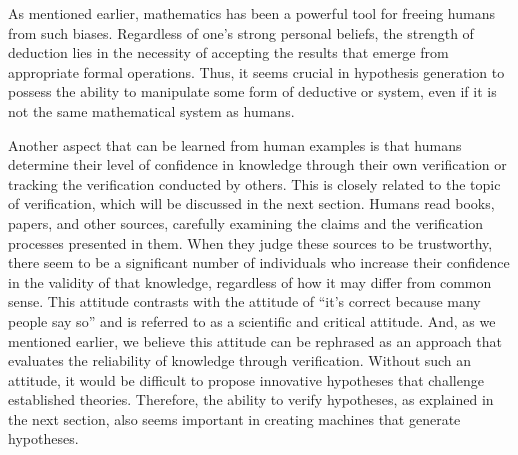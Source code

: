 \documentclass{book}
\begin{document}

As mentioned earlier, mathematics has been a powerful tool for freeing humans from such biases. Regardless of one's strong personal beliefs, the strength of deduction lies in the necessity of accepting the results that emerge from appropriate formal operations. Thus, it seems crucial in hypothesis generation to possess the ability to manipulate some form of deductive or system, even if it is not the same mathematical system as humans.

Another aspect that can be learned from human examples is that humans determine their level of confidence in knowledge through their own verification or tracking the verification conducted by others. This is closely related to the topic of verification, which will be discussed in the next section. Humans read books, papers, and other sources, carefully examining the claims and the verification processes presented in them. When they judge these sources to be trustworthy, there seem to be a significant number of individuals who increase their confidence in the validity of that knowledge, regardless of how it may differ from common sense. This attitude contrasts with the attitude of ``it's correct because many people say so'' and is referred to as a scientific and critical attitude. And, as we mentioned earlier, we believe this attitude can be rephrased as an approach that evaluates the reliability of knowledge through verification. Without such an attitude, it would be difficult to propose innovative hypotheses that challenge established theories. Therefore, the ability to verify hypotheses, as explained in the next section, also seems important in creating machines that generate hypotheses.

\end{document}
